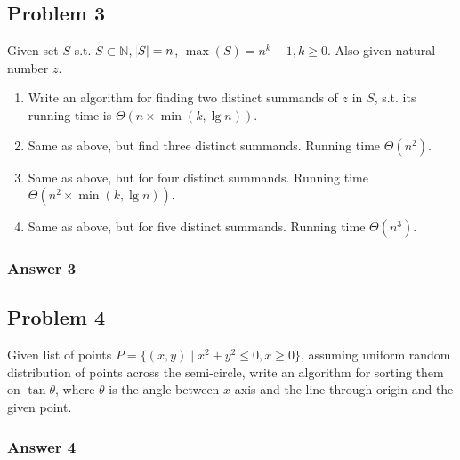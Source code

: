 \documentclass[11pt]{article}
\begin{document}
\subsection{Problem 3}
\label{sec-1-3}
Given set $S$ s.t. $S \subset \mathbb{N}$, $\abs{S} = n$, $\max(S) = n^k-1, k
   \geq 0$.  Also given natural number $z$.
\begin{enumerate}
\item Write an algorithm for finding two distinct summands of $z$ in $S$,
s.t. its running time is $\Theta(n \times \min(k, \lg n))$.
\item Same as above, but find three distinct summands.  Running time
$\Theta(n^2)$.
\item Same as above, but for four distinct summands.  Running time $\Theta(n^2
      \times \min(k, \lg n))$.
\item Same as above, but for five distinct summands.  Running time
$\Theta(n^3)$.
\end{enumerate}

\subsubsection{Answer 3}
\label{sec-1-3-1}

\subsection{Problem 4}
\label{sec-1-4}
Given list of points $P = \{(x, y) \;|\; x^2 + y^2 \leq 0, x \geq 0\}$,
assuming uniform random distribution of points across the semi-circle, write
an algorithm for sorting them on $\tan \theta$, where $\theta$ is the angle
between $x$ axis and the line through origin and the given point.

\subsubsection{Answer 4}
\label{sec-1-4-1}
\end{document}
